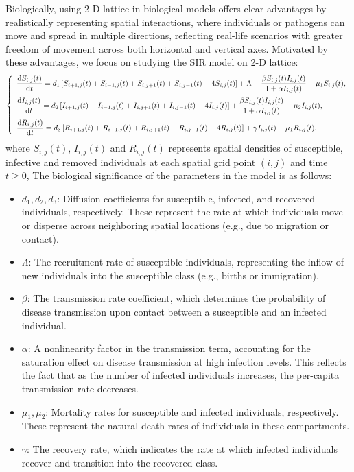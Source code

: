 \documentclass[final,3p,times]{elsarticle}
\numberwithin{equation}{section}
\begin{document}
Biologically, using 2-D lattice in biological models offers clear advantages by realistically representing spatial interactions, where individuals or pathogens can move and spread in multiple directions, reflecting real-life scenarios with greater freedom of movement across both horizontal and vertical axes. Motivated by these advantages, we focus on studying the SIR model on 2-D lattice:
\begin{equation}
\label{Model}\left\{
\begin{array}{l}
\vspace{2mm}
\displaystyle   \frac{\textrm{d} S_{i,j}(t)}{\textrm{d} t} = d_1\left[S_{i+1,j}(t)+S_{i-1,j}(t)+S_{i,j+1}(t)+S_{i,j-1}(t)-4S_{i,j}(t)\right] + \Lambda - \frac{\beta S_{i,j}(t)I_{i,j}(t)}{1+\alpha I_{i,j}(t)} - \mu_1 S_{i,j}(t),\\
\vspace{2mm}
\displaystyle   \frac{\textrm{d} I_{i,j}(t)}{\textrm{d} t} = d_2\left[I_{i+1,j}(t)+I_{i-1,j}(t)+I_{i,j+1}(t)+I_{i,j-1}(t)-4I_{i,j}(t)\right] + \frac{\beta S_{i,j}(t)I_{i,j}(t)}{1+\alpha I_{i,j}(t)} - \mu_2 I_{i,j}(t),\\
\displaystyle   \frac{\textrm{d} R_{i,j}(t)}{\textrm{d} t} = d_3\left[R_{i+1,j}(t)+R_{i-1,j}(t)+R_{i,j+1}(t)+R_{i,j-1}(t)-4R_{i,j}(t)\right] + \gamma I_{i,j}(t)-\mu_1R_{i,j}(t)  .
\end{array}\right.
\end{equation}
where $S_{i,j}(t)$, $I_{i,j}(t)$ and $R_{i,j}(t)$ represents spatial densities of susceptible, infective and removed individuals at each spatial grid point \((i, j)\) and time $t \geq 0$, The biological significance of the parameters in the model is as follows:

\begin{itemize}
    \item \(d_1, d_2, d_3\): Diffusion coefficients for susceptible, infected, and recovered individuals, respectively. These represent the rate at which individuals move or disperse across neighboring spatial locations (e.g., due to migration or contact).
    \item \(\Lambda\): The recruitment rate of susceptible individuals, representing the inflow of new individuals into the susceptible class (e.g., births or immigration).
    \item \(\beta\): The transmission rate coefficient, which determines the probability of disease transmission upon contact between a susceptible and an infected individual.
    \item \(\alpha\): A nonlinearity factor in the transmission term, accounting for the saturation effect on disease transmission at high infection levels. This reflects the fact that as the number of infected individuals increases, the per-capita transmission rate decreases.
    \item \(\mu_1, \mu_2\): Mortality rates for susceptible and infected individuals, respectively. These represent the natural death rates of individuals in these compartments.
    \item \(\gamma\): The recovery rate, which indicates the rate at which infected individuals recover and transition into the recovered class.
\end{itemize}
\end{document}
